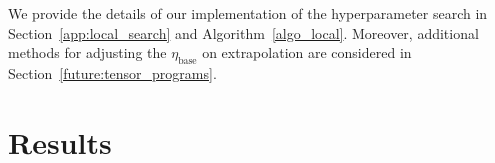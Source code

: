 \documentclass{article} %
\newcommand{\jl}[1]{\textcolor{green}{[JL: #1]}}
\newcommand{\jmr}[2]{\textcolor{purple}{[JM:] \sout{#1} #2}}
\begin{document}



    We provide the details of our implementation of the hyperparameter search in Section~\ref{app:local_search} and Algorithm~\ref{algo_local}. Moreover, additional methods for adjusting the $\eta_{\text{base}}$ on extrapolation are considered in Section~\ref{future:tensor_programs}.



    \section{Results}
\end{document}
